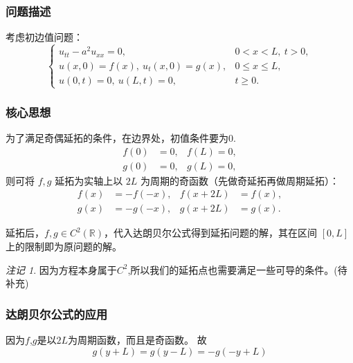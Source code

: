\documentclass[a4paper, 12pt, oneside]{article} %
\numberwithin{subsection}{section}
\numberwithin{subsubsection}{subsection}
\theoremstyle{plain}
\theoremstyle{definition}
\theoremstyle{remark}
\newtheorem{remark}[theorem]{注记}
\begin{document}
		\subsubsection{问题描述}
		考虑初边值问题：
		\begin{equation}
			\begin{cases}
				u_{tt} - a^2 u_{xx} = 0, & 0 < x < L, \ t > 0, \\
				u(x, 0) = f(x), \ u_t(x, 0) = g(x), & 0 \leq x \leq L, \\
				u(0, t) = 0, \ u(L, t) = 0, & t \geq 0.
			\end{cases}
		\end{equation}
		
		
		\subsubsection{核心思想}
		为了满足奇偶延拓的条件，在边界处，初值条件要为0.
		\begin{equation}
			\begin{aligned}
				f(0) & = 0, & f(L)  = 0, \\
				g(0) & =0, & g(L)  = 0,
			\end{aligned}
		\end{equation}
		则可将 \(f, g\) 延拓为实轴上以 \(2L\) 为周期的奇函数（先做奇延拓再做周期延拓）：
		\begin{equation}
			\begin{aligned}
				f(x) &= -f(-x), & f(x + 2L) &= f(x), \\
				g(x) &= -g(-x), & g(x + 2L) &= g(x).
			\end{aligned}
		\end{equation}
		
		延拓后，\(f, g \in C^2(\mathbb{R})\)，代入达朗贝尔公式得到延拓问题的解，其在区间 \([0, L]\) 上的限制即为原问题的解。
		
		\begin{remark}
			因为方程本身属于$C^2$,所以我们的延拓点也需要满足一些可导的条件。(待补充)
		\end{remark}
		
		
		\subsubsection{达朗贝尔公式的应用}
		因为$f$,$g$是以$2L$为周期函数，而且是奇函数。
		故
		\begin{equation}
			g(y + L) = g(y - L) = -g(-y + L)
		\end{equation}
		
\end{document}
